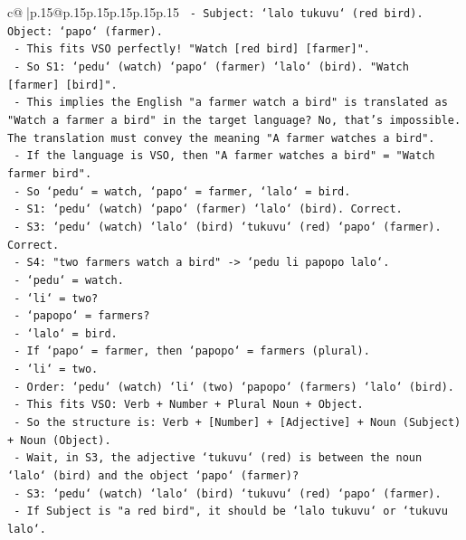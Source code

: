 \documentclass{article}
\begin{document}
{\begin{supertabular}{c@{$\;$}|p{.15\linewidth}@{}p{.15\linewidth}p{.15\linewidth}p{.15\linewidth}p{.15\linewidth}p{.15\linewidth}}
{{{\texttt{      {-} Subject: `lalo tukuvu` (red bird). Object: `papo` (farmer).} \\
\texttt{      {-} This fits VSO perfectly! "Watch {[}red bird{]} {[}farmer{]}".} \\
\texttt{      {-} So S1: `pedu` (watch) `papo` (farmer) `lalo` (bird). "Watch {[}farmer{]} {[}bird{]}".} \\
\texttt{      {-} This implies the English "a farmer watch a bird" is translated as "Watch a farmer a bird" in the target language? No, that's impossible. The translation must convey the meaning "A farmer watches a bird".} \\
\texttt{      {-} If the language is VSO, then "A farmer watches a bird" = "Watch farmer bird".} \\
\texttt{      {-} So `pedu` = watch, `papo` = farmer, `lalo` = bird.} \\
\texttt{      {-} S1: `pedu` (watch) `papo` (farmer) `lalo` (bird). Correct.} \\
\texttt{      {-} S3: `pedu` (watch) `lalo` (bird) `tukuvu` (red) `papo` (farmer). Correct.} \\
\texttt{      {-} S4: "two farmers watch a bird" {-}> `pedu li papopo lalo`.} \\
\texttt{        {-} `pedu` = watch.} \\
\texttt{        {-} `li` = two?} \\
\texttt{        {-} `papopo` = farmers?} \\
\texttt{        {-} `lalo` = bird.} \\
\texttt{        {-} If `papo` = farmer, then `papopo` = farmers (plural).} \\
\texttt{        {-} `li` = two.} \\
\texttt{        {-} Order: `pedu` (watch) `li` (two) `papopo` (farmers) `lalo` (bird).} \\
\texttt{        {-} This fits VSO: Verb + Number + Plural Noun + Object.} \\
\texttt{        {-} So the structure is: Verb + {[}Number{]} + {[}Adjective{]} + Noun (Subject) + Noun (Object).} \\
\texttt{        {-} Wait, in S3, the adjective `tukuvu` (red) is between the noun `lalo` (bird) and the object `papo` (farmer)?} \\
\texttt{        {-} S3: `pedu` (watch) `lalo` (bird) `tukuvu` (red) `papo` (farmer).} \\
\texttt{        {-} If Subject is "a red bird", it should be `lalo tukuvu` or `tukuvu lalo`.} \\
}}}
\end{supertabular}}
\end{document}

